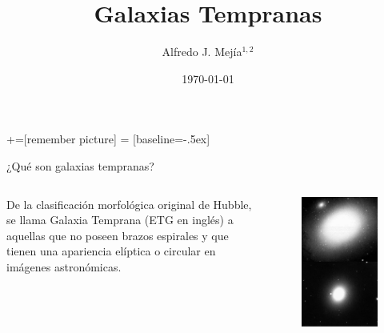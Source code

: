 \documentclass[xcolor=dvipsnames,4pt]{beamer}
\newenvironment{changemargin}[2]{%
  \begin{list}{}{%
    \setlength{\topsep}{0pt}%
    \setlength{\leftmargin}{#1}%
    \setlength{\rightmargin}{#2}%
    \setlength{\listparindent}{\parindent}%
    \setlength{\itemindent}{\parindent}%
    \setlength{\parsep}{\parskip}%
  }%
\item[]}{\end{list}}
\begin{document}
+=[remember picture]
 = [baseline=-.5ex]

\begin{frame}
\title{Galaxias Tempranas}
\author{Alfredo J. Mej\'ia$^{1,2}$}

\date{\today}


\maketitle
\end{frame}

\begin{frame}{¿Qué son galaxias tempranas?}
\begin{changemargin}{-1cm}{-3cm}
\begin{columns}
De la clasificación morfológica original de Hubble, se llama Galaxia Temprana (ETG en inglés) a aquellas que no poseen brazos espirales y que tienen una apariencia elíptica o circular en imágenes astronómicas.
\begin{figure}
\includegraphics[scale=0.65]{img/m86anon_m49noao.png}
\end{figure}
\end{columns}
\end{changemargin}
\end{frame}
\end{document}
